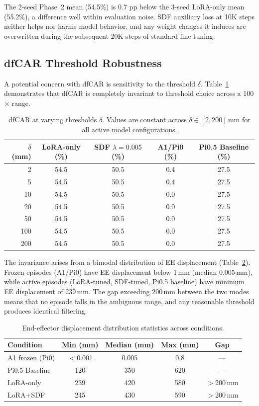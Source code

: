 \documentclass[10pt,letterpaper]{article}
\begin{document}
The 2-seed Phase~2 mean (54.5\%) is 0.7 pp below the 3-seed LoRA-only mean (55.2\%), a difference well within evaluation noise. SDF auxiliary loss at 10K steps neither helps nor harms model behavior, and any weight changes it induces are overwritten during the subsequent 20K steps of standard fine-tuning.

\subsection{dfCAR Threshold Robustness}
\label{sec:dfcar_robust}

A potential concern with dfCAR is sensitivity to the threshold $\delta$. Table~\ref{tab:dfcar_threshold} demonstrates that dfCAR is completely invariant to threshold choice across a 100$\times$ range.

\begin{table}[t]
\centering
\caption{dfCAR at varying thresholds $\delta$. Values are constant across $\delta \in [2, 200]$\,mm for all active model configurations.}
\label{tab:dfcar_threshold}
\begin{tabular}{rcccc}
\toprule
$\delta$ (mm) & LoRA-only (\%) & SDF $\lambda{=}0.005$ (\%) & A1/Pi0 (\%) & Pi0.5 Baseline (\%) \\
\midrule
2 & 54.5 & 50.5 & 0.4 & 27.5 \\
5 & 54.5 & 50.5 & 0.4 & 27.5 \\
10 & 54.5 & 50.5 & 0.0 & 27.5 \\
20 & 54.5 & 50.5 & 0.0 & 27.5 \\
50 & 54.5 & 50.5 & 0.0 & 27.5 \\
100 & 54.5 & 50.5 & 0.0 & 27.5 \\
200 & 54.5 & 50.5 & 0.0 & 27.5 \\
\bottomrule
\end{tabular}
\end{table}

The invariance arises from a bimodal distribution of EE displacement (Table~\ref{tab:ee_dist}). Frozen episodes (A1/Pi0) have EE displacement below 1\,mm (median 0.005\,mm), while active episodes (LoRA-tuned, SDF-tuned, Pi0.5 baseline) have minimum EE displacement of 239\,mm. The gap exceeding 200\,mm between the two modes means that no episode falls in the ambiguous range, and any reasonable threshold produces identical filtering.

\begin{table}[t]
\centering
\caption{End-effector displacement distribution statistics across conditions.}
\label{tab:ee_dist}
\begin{tabular}{lcccc}
\toprule
Condition & Min (mm) & Median (mm) & Max (mm) & Gap \\
\midrule
A1 frozen (Pi0) & $<$0.001 & 0.005 & 0.8 & --- \\
Pi0.5 Baseline & 120 & 350 & 620 & --- \\
LoRA-only & 239 & 420 & 580 & $>$200\,mm \\
LoRA+SDF & 245 & 430 & 590 & $>$200\,mm \\
\bottomrule
\end{tabular}
\end{table}
\end{document}
